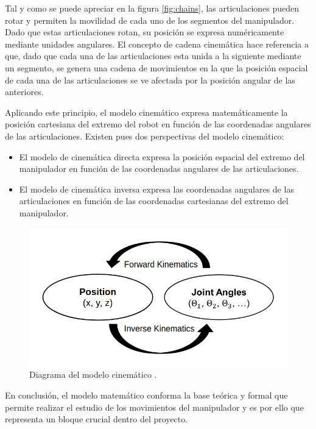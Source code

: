 Tal y como se puede apreciar en la figura \ref{fig:chains}, las articulaciones pueden rotar y permiten la movilidad de cada uno de los segmentos del manipulador. Dado que estas articulaciones rotan, su posición se expresa numéricamente mediante unidades angulares. El concepto de cadena cinemática hace referencia a que, dado que cada una de las articulaciones esta unida a la siguiente mediante un segmento, se genera una cadena de movimientos en la que la posición espacial de cada una de las articulaciones se ve afectada por la posición angular de las anteriores.

Aplicando este principio, el modelo cinemático expresa matemáticamente la posición cartesiana del extremo del robot en función de las coordenadas angulares de las articulaciones. Existen pues dos perspectivas del modelo cinemático:

\begin{itemize}
    \item El modelo de cinemática directa expresa la posición espacial del extremo del manipulador en función de las coordenadas angulares de las articulaciones.
    \item El modelo de cinemática inversa expresa las coordenadas angulares de las articulaciones en función de las coordenadas cartesianas del extremo del manipulador.
\end{itemize}

\begin{figure}[H]
    \centering 
    \includegraphics[width=.6\linewidth]{pictures/Kinematic Diagram.png}
    \caption{Diagrama del modelo cinemático \cite{noauthor_roboy_nodate}.}
    \label{fig:kdiagram}
\end{figure}

En conclusión, el modelo matemático conforma la base teórica y formal que permite realizar el estudio de los movimientos del manipulador y es por ello que representa un bloque crucial dentro del proyecto.


